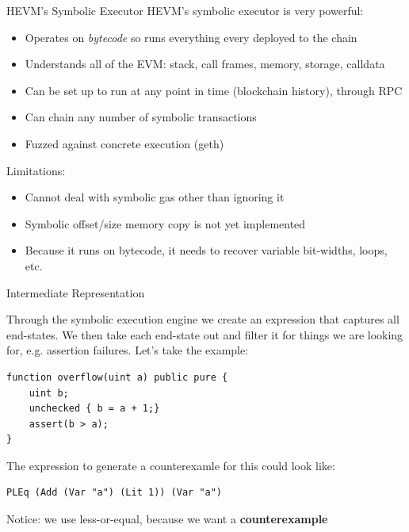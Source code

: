 \documentclass[aspectratio=169]{beamer}
\begin{document}
\begin{frame}{HEVM's Symbolic Executor}
HEVM's symbolic executor is very powerful:
\begin{itemize}
\item Operates on \emph{bytecode} so runs everything every deployed to the chain
\item Understands all of the EVM: stack, call frames, memory, storage, calldata
\item Can be set up to run at any point in time (blockchain history), through RPC
\item Can chain any number of symbolic transactions
\item Fuzzed against concrete execution (geth)
\end{itemize}
\bigskip

Limitations:
\begin{itemize}
\item Cannot deal with symbolic gas other than ignoring it
\item Symbolic offset/size memory copy is not yet implemented
\item Because it runs on bytecode, it needs to recover variable bit-widths, loops, etc.
\end{itemize}
\end{frame}


\begin{frame}[fragile=singleslide]{Intermediate Representation}
\small

Through the symbolic execution engine we create an expression that captures all end-states. We then take each end-state out and filter it for things we are looking for, e.g. assertion failures. Let's take the example:


\begin{Verbatim}[frame=single, framerule=0.2mm,framesep=2mm,fontsize=\small]
function overflow(uint a) public pure {
	uint b;
	unchecked { b = a + 1;}
	assert(b > a);
}
\end{Verbatim}

The expression to generate a counterexamle for this could look like:

\begin{Verbatim}[frame=single, framerule=0.2mm, framesep=2mm,fontsize=\small]
PLEq (Add (Var "a") (Lit 1)) (Var "a")
\end{Verbatim}

Notice: we use less-or-equal, because we want a \textbf{counterexample}
\end{frame}
\end{document}
